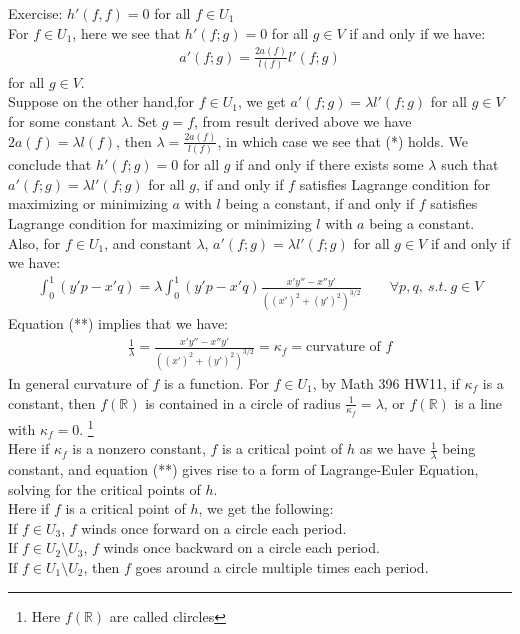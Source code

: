 \documentclass[11pt,oneside]{book}
\theoremstyle{break}
\theoremstyle{break}
\newcommand{\R}{\mathbb{R}}
\newcommand{\exercise}{\color{green}Exercise: \color{black}}
\begin{document}
\exercise $h'(f,f) = 0$ for all $f \in U_1$\\

For $f \in U_1$, here we see that $h'(f;g) = 0$ for all $g \in V$ if and only if we have:
\begin{align*}
a'(f;g) = \frac{2a(f)}{l(f)}l'(f;g) \tag{*}
\end{align*}
for all $g \in V$. \\

Suppose on the other hand,for $f \in U_1$, we get $a'(f;g) = \lambda l'(f;g)$ for all $g \in V$ for some constant $\lambda$. Set $g = f$, from result derived above we have $2a(f) = \lambda l(f)$, then $\lambda = \frac{2a(f)}{l(f)}$, in which case we see that (*) holds. We conclude that $h'(f;g) = 0$ for all $g$ if and only if there exists some $\lambda$ such that $a'(f;g) = \lambda l'(f;g)$ for all $g$, if and only if $f$ satisfies Lagrange condition for maximizing or minimizing $a$ with $l$ being a constant, if and only if $f$ satisfies Lagrange condition for maximizing or minimizing $l$ with $a$ being a constant. \\

Also, for $f \in U_1$, and constant $\lambda$, $a'(f;g) = \lambda l'(f;g)$ for all $g \in V$ if and only if we have:
\begin{align*}
\int_0^1 (y'p - x'q) = \lambda \int_0^1 (y'p - x'q)\frac{x'y''-x''y'}{((x')^2 + (y')^2)^{3/2}} \qquad \forall p,q,\ s.t.\ g\in V \tag{**}
\end{align*}
Equation (**) implies that we have:
\begin{align*}
\frac{1}{\lambda} = \frac{x'y'' - x''y'}{((x')^2 + (y')^2)^{3/2}} = \kappa_f =\text{curvature of }f 
\end{align*}
In general curvature of $f$ is a function. For $f \in U_1$, by Math 396 HW11, if $\kappa_f $ is a constant, then $f(\R)$ is contained in a circle of radius $\frac{1}{\kappa_f} = \lambda$, or $f(\R)$ is a line with $\kappa_f = 0$. \footnote{Here $f(\R)$ are called clircles} \\

Here if $\kappa_f$ is a nonzero constant, $f$ is a critical point of $h$ as we have $\frac{1}{\lambda}$ being constant, and equation (**) gives rise to a form of Lagrange-Euler Equation, solving for the critical points of $h$.\\

Here if $f$ is a critical point of $h$, we get the following:\\
If $f\in U_3$, $f$ winds once forward on a circle each period.\\
If $f \in U_2 \setminus U_3$, $f$ winds once backward on a circle each period.\\
If $f \in U_1 \setminus U_2$, then $f$ goes around a circle multiple times each period. \\
\end{document}
